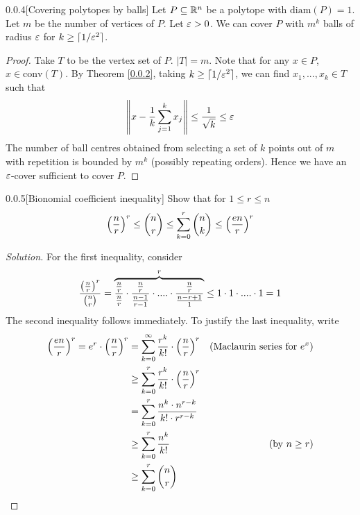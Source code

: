 
\begin{cor}{0.0.4}[Covering polytopes by balls]\label{0.0.4}
Let $P \subseteq \mathbb{R}^n$ be a polytope with $\text{diam}(P) = 1$. Let $m$ be the number of vertices of $P$. Let $\varepsilon >0$.
We can cover $P$ with $m^k$ balls of radius $\varepsilon$ for $k \geq \lceil 1/\varepsilon^2 \rceil$.
\end{cor}

\begin{proof}
Take $T$ to be the vertex set of $P$. $|T| = m$. Note that for any $x\in P$, $x \in \text{conv}(T)$.
By Theorem \ref{0.0.2}, taking $k \geq \lceil 1/\varepsilon^2\rceil$, we can find $x_1,...,x_k \in T$ such that
\begin{align*}
    \left\|x - \frac1k\sum_{j=1}^k x_j\right\| \leq \frac1 {\sqrt k} \leq \varepsilon 
\end{align*}
The number of ball centres obtained from selecting a set of $k$ points out of $m$ with repetition is bounded by $m^k$ (possibly repeating orders).
Hence we have an $\varepsilon$-cover sufficient to cover $P$.
\end{proof}

\begin{ex}{0.0.5}[Bionomial coefficient inequality]\label{0.0.5}
Show that for $1 \leq r \leq n$
\begin{align*}
    \left(\frac n r \right)^r \leq \binom{n}{r} \leq \sum_{k=0}^r \binom{n}{k} \leq \left(\frac{en}r\right)^r
\end{align*}
\end{ex}

\begin{proof}[Solution] 
For the first inequality, consider
\begin{align*}
    \frac{\left(\frac n r \right)^r}{\binom{n}{r}} = {\overbrace{\frac{\frac n r}{\frac n r}\cdot \frac{\frac n r}{\frac {n-1} {r-1}} \cdot .... \cdot \frac{\frac n r}{\frac {n-r+1} 1}}^r}
    \leq 1 \cdot 1 \cdot .... \cdot 1 = 1
\end{align*}
The second inequality follows immediately. To justify the last inequality, write
\begin{align*}
    \left(\frac {en} {r}\right)^r = e^r \cdot \left(\frac n r\right)^r &= \sum_{k=0}^\infty \frac {r^k} {k!} \cdot \left(\frac n r\right)^r &\text{(Maclaurin series for $e^x$)} \\
    &\geq \sum_{k=0}^r \frac {r^k} {k!} \cdot \left(\frac n r\right)^r \\
    &= \sum_{k=0}^r \frac {n^k \cdot n^{r-k}} {k! \cdot r^{r-k}} \\
    &\geq \sum_{k=0}^r \frac {n^k } {k!} &\text{(by $n \geq r$)}\\
    &\geq \sum_{k=0}^r \binom{n}{r}
\end{align*}
\end{proof}

